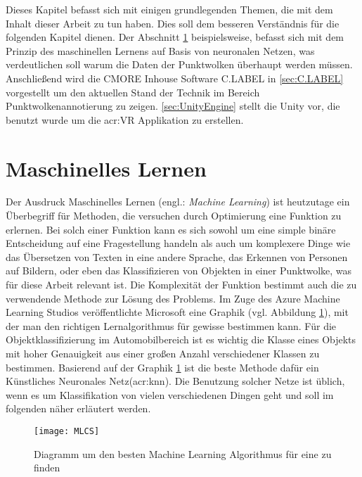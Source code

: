 \graphicspath{{Kapitel/Kapitel3_Grundlagen/Images/}}

Dieses Kapitel befasst sich mit einigen grundlegenden Themen, die mit dem Inhalt dieser Arbeit zu tun haben. Dies soll dem besseren Verständnis für die folgenden Kapitel dienen. Der Abschnitt \ref{sec:MLearning} beispielsweise, befasst sich mit dem Prinzip des maschinellen Lernens auf Basis von neuronalen Netzen, was verdeutlichen soll warum die Daten der Punktwolken überhaupt  werden müssen. Anschließend wird die CMORE Inhouse Software C.LABEL in \ref{sec:C.LABEL} vorgestellt um den aktuellen Stand der Technik im Bereich Punktwolkenannotierung zu zeigen. \ref{sec:UnityEngine} stellt die  Unity vor, die benutzt wurde um die \acrlong{acr:VR} Applikation zu erstellen.

\section{Maschinelles Lernen}
\label{sec:MLearning}
Der Ausdruck Maschinelles Lernen (engl.: \textit{Machine Learning}) ist heutzutage ein Überbegriff für Methoden, die versuchen durch Optimierung eine Funktion zu erlernen. Bei solch einer Funktion kann es sich sowohl um eine simple binäre Entscheidung auf eine Fragestellung handeln als auch um komplexere Dinge wie das Übersetzen von Texten in eine andere Sprache, das Erkennen von Personen auf Bildern, oder eben das Klassifizieren von Objekten in einer Punktwolke, was für diese Arbeit relevant ist. Die Komplexität der Funktion bestimmt auch die zu verwendende Methode zur Lösung des Problems. Im Zuge des Azure Machine Learning Studios veröffentlichte Microsoft eine Graphik (vgl. Abbildung \ref{fig:MLCS}), mit der man den richtigen Lernalgorithmus für gewisse  bestimmen kann. Für die Objektklassifizierung im Automobilbereich ist es wichtig die Klasse eines Objekts mit hoher Genauigkeit aus einer großen Anzahl verschiedener Klassen zu bestimmen. Basierend auf der Graphik \ref{fig:MLCS} ist die beste Methode dafür ein Künstliches Neuronales Netz(\acrshort{acr:knn}). Die Benutzung solcher Netze ist üblich, wenn es um Klassifikation von vielen verschiedenen Dingen geht und soll im folgenden näher erläutert werden.

\begin{figure}%
	\centering
    \texttt{[image: MLCS]}
    \caption{Diagramm um den besten Machine Learning Algorithmus für eine  zu finden}
    \label{fig:MLCS}
\end{figure}
  
